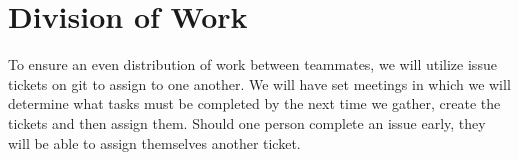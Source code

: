 \documentclass[10pt]{article}
\begin{document}
\section{Division of Work}
To ensure an even distribution of work between teammates, we will utilize issue tickets on git to assign to one another. We will have set meetings in which
we will determine what tasks must be completed by the next time we gather, create the tickets and then assign them. Should one person complete an issue early,
they will be able to assign themselves another ticket.


\end{document}
